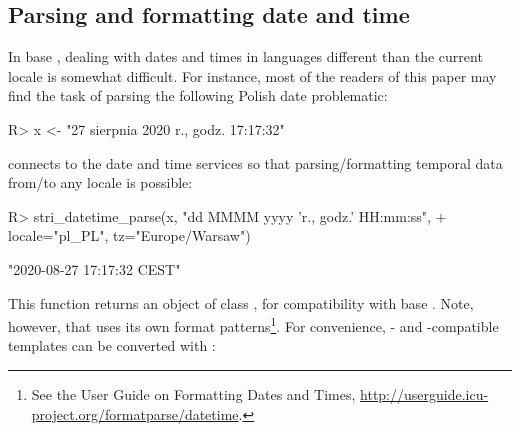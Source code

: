 \documentclass[nojss]{jss}
\begin{document}




%








\subsection{Parsing and formatting date and time}\label{Sec:datetime}

In base , dealing with dates and times in languages
different than the current locale is somewhat difficult.
For instance, most of the readers of this paper
may find the task of parsing the following Polish date problematic:

\begin{Schunk}
\begin{Sinput}
R> x <- "27 sierpnia 2020 r., godz. 17:17:32"
\end{Sinput}
\end{Schunk}

 connects to the  date and time
services  so that parsing/formatting temporal data from/to any locale
is possible:


\begin{Schunk}
\begin{Sinput}
R> stri_datetime_parse(x, "dd MMMM yyyy 'r., godz.' HH:mm:ss",
+    locale="pl_PL", tz="Europe/Warsaw")
\end{Sinput}
\begin{Soutput}
[1] "2020-08-27 17:17:32 CEST"
\end{Soutput}
\end{Schunk}

This function returns an object of class ,
for compatibility with base .
Note, however, that
 uses its own format patterns\footnote{
See the  User Guide on {Formatting Dates and Times},
\url{http://userguide.icu-project.org/formatparse/datetime}.
}. For convenience,
- and -compatible
templates can be converted with :
\end{document}
